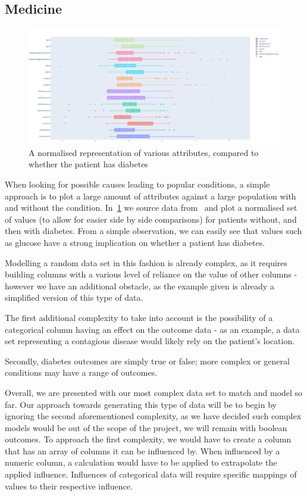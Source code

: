 \subsection{Medicine}

\begin{figure}
    \centering
    \includegraphics[width=12cm]{figures/real_data_examples/diabetes_attributes}
    \caption{A normalised representation of various attributes, compared to whether the patient has diabetes}
    \label{fig:real_data_diabetes}
\end{figure}

When looking for possible causes leading to popular conditions, a simple approach is to plot a large amount of
attributes against a large population with and without the condition.
In~\ref{fig:real_data_diabetes} we source data from~\cite{KaggleDiabetes} and plot a normalised set of values (to allow
for easier side by side comparisons) for patients without, and then with diabetes.
From a simple observation, we can easily see that values such as glucose have a strong implication on whether a patient
has diabetes.

Modelling a random data set in this fashion is already complex, as it requires building columns with a various level of
reliance on the value of other columns - however we have an additional obstacle, as the example given is already a
simplified version of this type of data.

The first additional complexity to take into account is the possibility of a categorical column having an effect on the
outcome data - as an example, a data set representing a contagious disease would likely rely on the patient's location.

Secondly, diabetes outcomes are simply true or false;
more complex or general conditions may have a range of outcomes.

Overall, we are presented with our most complex data set to match and model so far.
Our approach towards generating this type of data will be to begin by ignoring the second aforementioned complexity, as
we have decided such complex models would be out of the scope of the project, we will remain with boolean outcomes.
To approach the first complexity, we would have to create a column that has an array of columns it can be influenced by.
When influenced by a numeric column, a calculation would have to be applied to extrapolate the applied influence.
Influences of categorical data will require specific mappings of values to their respective influence.


